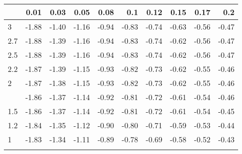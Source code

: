 
\begin{tabular}{lrrrrrrrrr}
\toprule{}
  & 0.01 & 0.03 & 0.05 & 0.08 & 0.1 & 0.12 & 0.15 & 0.17 & 0.2\\
\midrule{}
3 & -1.88 & -1.40 & -1.16 & -0.94 & -0.83 & -0.74 & -0.63 & -0.56 & -0.47\\
2.7 & -1.88 & -1.39 & -1.16 & -0.94 & -0.83 & -0.74 & -0.62 & -0.56 & -0.47\\
2.5 & -1.88 & -1.39 & -1.16 & -0.94 & -0.83 & -0.74 & -0.62 & -0.56 & -0.47\\
2.2 & -1.87 & -1.39 & -1.15 & -0.93 & -0.82 & -0.73 & -0.62 & -0.55 & -0.46\\
2 & -1.87 & -1.38 & -1.15 & -0.93 & -0.82 & -0.73 & -0.62 & -0.55 & -0.46\\
\addlinespace
1.7 & -1.86 & -1.37 & -1.14 & -0.92 & -0.81 & -0.72 & -0.61 & -0.54 & -0.46\\
1.5 & -1.86 & -1.37 & -1.14 & -0.92 & -0.81 & -0.72 & -0.61 & -0.54 & -0.45\\
1.2 & -1.84 & -1.35 & -1.12 & -0.90 & -0.80 & -0.71 & -0.59 & -0.53 & -0.44\\
1 & -1.83 & -1.34 & -1.11 & -0.89 & -0.78 & -0.69 & -0.58 & -0.52 & -0.43\\
\bottomrule{}
\end{tabular}
